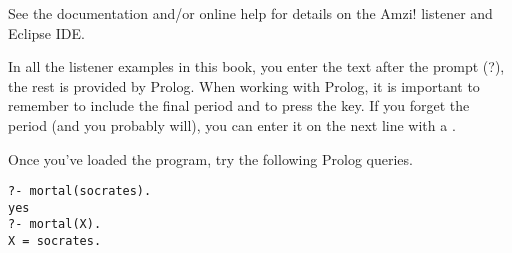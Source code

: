 See the documentation and/or online help for details on the Amzi! listener and
Eclipse IDE.

In all the listener examples in this book, you enter the text after the prompt
(?), the rest is provided by Prolog. When working with Prolog, it is important
to remember to include the final period  and to press the 
key. If you forget the period (and you probably will), you can enter it on the
next line with a .

Once you've loaded the program, try the following Prolog queries.
\begin{verbatim}
?- mortal(socrates).
yes
?- mortal(X).
X = socrates.
\end{verbatim}

\secup
